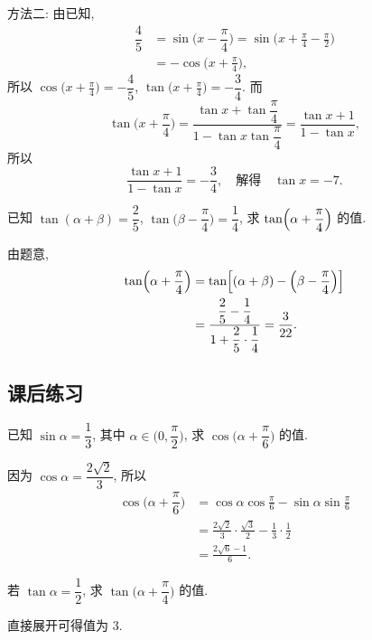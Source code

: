    方法二: 由已知, 
    \[\begin{aligned}
        \dfrac45
        &= \sin\Big(x-\dfrac\pi4\Big)
         = \sin\biggl(x+\frac\pi4- \frac\pi2\biggr)\\
        &= -\cos\biggl(x+\frac\pi4\biggr),
    \end{aligned}\]
    所以 $\cos\biggl(x+\frac\pi4\biggr)= -\dfrac45$, $\tan\biggl(x+\frac\pi4\biggr)= -\dfrac34$. 而 
    \[\tan\biggl(x+\frac\pi4\biggr)
        = \frac{\tan x+\tan\dfrac\pi4}{1- \tan x\tan\dfrac\pi4}= \frac{\tan x+ 1}{1-\tan x},\]
    所以
    \[\frac{\tan x+ 1}{1-\tan x}= -\dfrac34,
        \quad\text{解得}\quad \tan x= -7.\]
\endsolution

\begin{exercise}
    已知 $\tan(\alpha+\beta)=\dfrac25$, 
    $\tan\Big(\beta-\dfrac\pi4\Big)= \dfrac14$, 
    求 $\tan\Bigl(\alpha+\dfrac\pi4\Bigr)$ 的值.
\end{exercise}
\beginsolution
    由题意,
    \[\begin{aligned}
        \tan\Bigl(\alpha+\dfrac\pi4\Bigr)
        &= \tan\Bigl[(\alpha+\beta)- \Bigl(\beta-\dfrac\pi4\Bigr)\Bigr]\\
        &= \frac{\dfrac25- \dfrac14}{1+ \dfrac25\cdot\dfrac14}
         = \dfrac{3}{22}.
    \end{aligned}\]
\endsolution

\subsection{课后练习}

\begin{exercise}
    已知 $\sin \alpha=\dfrac13$, 其中 $\alpha\in\Big(0,\dfrac\pi2\Big)$, 求 $\cos\Big(\alpha+\dfrac\pi6\Big)$ 的值.
\end{exercise}
\beginsolution
    因为 $\cos\alpha= \dfrac{2\sqrt2}{3}$, 所以
    \[\begin{aligned}
        \cos\Big(\alpha+\dfrac\pi6\Big)
        &= \cos\alpha\cos\frac\pi6- \sin\alpha\sin\frac\pi6\\
        &= \frac{2\sqrt2}{3}\cdot\frac{\sqrt3}{2}
            - \frac13\cdot\frac12\\
        &= \frac{2\sqrt6-1}{6}.
    \end{aligned}\]
\endsolution

\begin{exercise}
    若 $\tan \alpha=\dfrac12$, 求 $\tan\Big(\alpha+\dfrac\pi4\Big)$ 的值.
\end{exercise}
\beginsolution
    直接展开可得值为 $3$.
\endsolution

